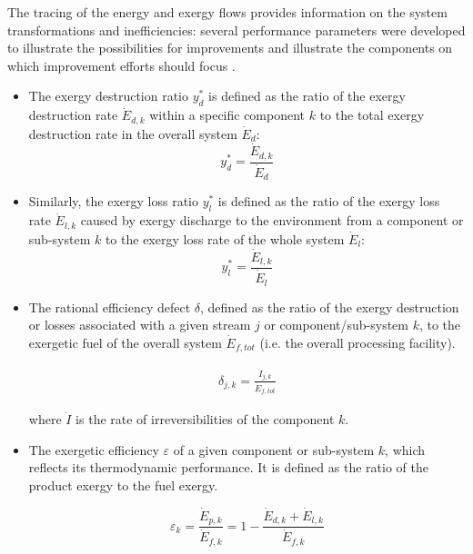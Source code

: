 \documentclass[final,times,3p]{elsarticle}
\begin{document}

	The tracing of the energy and exergy flows provides information on the system transformations and inefficiencies: several performance parameters were developed to illustrate the possibilities for improvements and illustrate the components on which improvement efforts should focus \cite{BejanAdrian;TsatsaronisGeorge;Moran1996,Kotas1980,Kotas1980a,Kotas1995}. 

	\begin{itemize}	
		\item The exergy destruction ratio $y_{d}^{*}$ is defined as the ratio of the exergy destruction rate $\dot{E}_{d,k}$ within a specific component $k$ to the total exergy destruction rate in the overall system $\dot{E}_{d}$:  
	\begin{equation} y_{d}^{*}=\frac{\dot{E}_{d,k}}{\dot{E}_{d}} \end{equation}
	
		\item Similarly, the exergy loss ratio $y_{l}^{*}$ is defined as the ratio of the exergy loss rate $\dot{E}_{l,k}$ caused by exergy discharge to the environment from a component or sub-system $k$ to the exergy loss rate of the whole system $\dot{E}_{l}$:  
	\begin{equation} y_{l}^{*}=\frac{\dot{E}_{l,k}}{\dot{E}_{l}} \end{equation}

	\item The rational efficiency defect $\delta$, defined as the ratio of the exergy destruction or losses associated with a given stream $j$ or component/sub-system $k$, to the exergetic fuel of the overall system $\dot{E}_{f,tot}$ (i.e. the overall processing facility).
	
	\begin{align}
		\delta_{j,k} = \frac{\dot{I}_{j,k}}{\dot{E}_{f,tot}}
	\end{align}
	
		where $\dot{I}$ is the rate of irreversibilities of the component $k$. 
		
		\item The exergetic efficiency $\varepsilon$ of a given component or sub-system $k$, which reflects its thermodynamic performance. It is defined as the ratio of the product exergy to the fuel exergy. 
	
	\begin{equation}
		\varepsilon_k=\frac{\dot{E}_{p,k}}{\dot{E}_{f,k}}=1-\frac{\dot{E}_{d,k}+\dot{E}_{l,k}}{\dot{E}_{f,k}}
	\end{equation}
	

\end{itemize}
\end{document}
